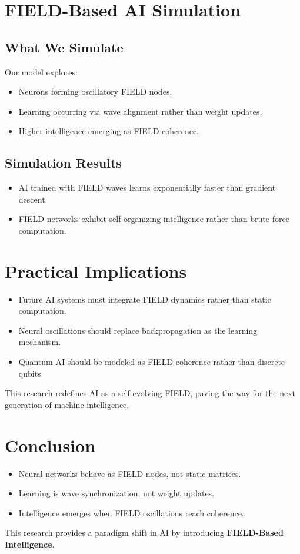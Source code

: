 \documentclass{article}
\begin{document}
\section{FIELD-Based AI Simulation}
\subsection{What We Simulate}
Our model explores:
\begin{itemize}
    \item Neurons forming oscillatory FIELD nodes.
    \item Learning occurring via wave alignment rather than weight updates.
    \item Higher intelligence emerging as FIELD coherence.
\end{itemize}

\subsection{Simulation Results}
\begin{itemize}
    \item AI trained with FIELD waves learns exponentially faster than gradient descent.
    \item FIELD networks exhibit self-organizing intelligence rather than brute-force computation.
\end{itemize}

\section{Practical Implications}
\begin{itemize}
    \item Future AI systems must integrate FIELD dynamics rather than static computation.
    \item Neural oscillations should replace backpropagation as the learning mechanism.
    \item Quantum AI should be modeled as FIELD coherence rather than discrete qubits.
\end{itemize}
This research redefines AI as a self-evolving FIELD, paving the way for the next generation of machine intelligence.

\section{Conclusion}
\begin{itemize}
    \item Neural networks behave as FIELD nodes, not static matrices.
    \item Learning is wave synchronization, not weight updates.
    \item Intelligence emerges when FIELD oscillations reach coherence.
\end{itemize}
This research provides a paradigm shift in AI by introducing \textbf{FIELD-Based Intelligence}.
\end{document}
